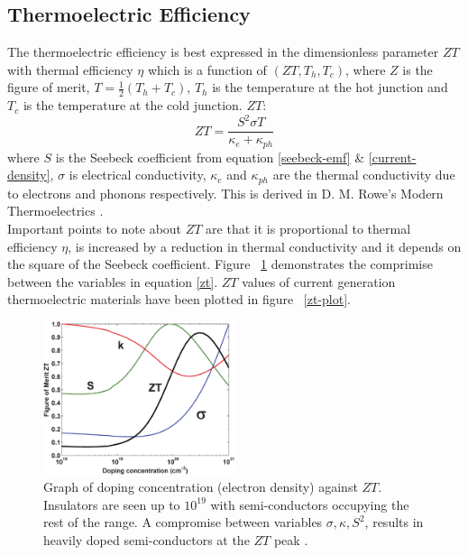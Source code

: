 \documentclass[a4paper,10pt,journal]{IEEEtran}
\newcommand{\figref}[2][\figurename~]{#1\ref{#2}}
\begin{document}
\subsection{Thermoelectric Efficiency}
The thermoelectric efficiency is best expressed in the dimensionless
parameter $ZT$ with thermal efficiency $\eta$ which is a function of $(ZT, T_h,
T_c)$, where $Z$ is the figure of merit, $T = \frac{1}{2}(T_h +
T_c)$, $T_h$ is the temperature at the hot junction and $T_c$ is the
temperature at the cold junction. $ZT$:
\begin{equation}
\label{zt}
	ZT = \frac{S^2 \sigma T}{\kappa_e + \kappa_{ph}}
\end{equation}
where $S$ is the Seebeck coefficient from equation \eqref{seebeck-emf}
\& \eqref{current-density}, $\sigma$ is electrical conductivity,
$\kappa_e$ and $\kappa_{ph}$ are the thermal conductivity due to
electrons and phonons respectively. This is derived in D. M. Rowe's Modern
Thermoelectrics \cite{modern-thermoelectrics}.\\
Important points to note about $ZT$ are that it is proportional to thermal efficiency $\eta$, is increased by a reduction in thermal conductivity and it depends on the square of the Seebeck coefficient. Figure \figref{zt-dope} demonstrates the comprimise between the variables in equation \eqref{zt}. $ZT$ values of current generation thermoelectric materials have been plotted in figure \figref{zt-plot}.

\begin{figure}
	\centering
	\includegraphics[width=0.5\textwidth]{zt-dope-plot.png}
	\caption{Graph of doping concentration (electron density) against $ZT$.  Insulators are seen up to $10^{19}$ with semi-conductors occupying the rest of the range. A compromise between variables $\sigma, \kappa, S^2$, results in heavily doped semi-conductors at the $ZT$ peak \cite{minnich-review}.}
	\label{zt-dope}
\end{figure}
\end{document}
